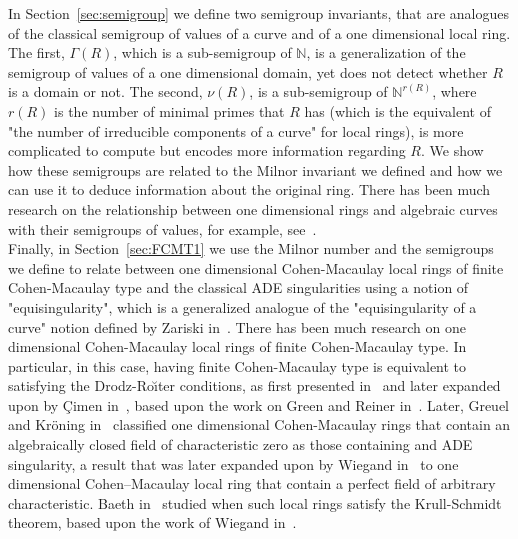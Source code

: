 \documentclass{article}
\numberwithin{theorem}{section}
\begin{document}
In Section~\ref{sec:semigroup} we define two semigroup invariants, that are analogues of the classical semigroup of values of a curve and of a one dimensional local ring. The first, $\Gamma(R)$, which is a sub-semigroup of $\mathbb{N}$, is a generalization of the semigroup of values of a one dimensional domain, yet does not detect whether $R$ is a domain or not. The second, $\nu(R)$, is a sub-semigroup of $\mathbb{N}^{r(R)}$, where $r(R)$ is the number of minimal primes that $R$ has (which is the equivalent of "the number of irreducible components of a curve" for local rings), is more complicated to compute but encodes more information regarding $R$. We show how these semigroups are related to the Milnor invariant we defined and how we can use it to deduce information about the original ring. There has been much research on the relationship between one dimensional rings and algebraic curves with their semigroups of values, for example, see~\cite{assi2020numerical, barroso2012approach, barroso2022note, castellanos2005semigroup, campillo1994gorenstein, d2025value, de1987semigroup, kunz1970value, zariski2006moduli}. \\

Finally, in Section~\ref{sec:FCMT1} we use the Milnor number and the semigroups we define to relate between one dimensional Cohen-Macaulay local rings of finite Cohen-Macaulay type and the classical ADE singularities using a notion of "equisingularity", which is a generalized analogue of the "equisingularity of a curve" notion defined by Zariski in~\cite{zariski2006moduli}. There has been much research on one dimensional Cohen-Macaulay local rings of finite Cohen-Macaulay type. In particular, in this case, having finite Cohen-Macaulay type is equivalent to satisfying the Drodz-Ro\u{\i}ter conditions,  as first presented in~\cite{drozd1967commutative} and later expanded upon by \c{C}imen in~\cite{ccimen1998one}, based upon the work on Green and Reiner in~\cite{green1978integral}. Later, Greuel and Kr\"oning in~\cite{greuel1984einfache} classified one dimensional Cohen-Macaulay rings that contain an algebraically closed field  of characteristic zero as those containing and ADE singularity, a result that was later expanded upon by Wiegand in~\cite{wiegand1991curve, wiegand1994one} to one dimensional Cohen–Macaulay local ring that contain a perfect field of arbitrary characteristic. Baeth in~\cite{baeth2007krull} studied when such local rings satisfy the Krull-Schmidt theorem, based upon the work of Wiegand in~\cite{wiegand2023failure}. \\
\end{document}
